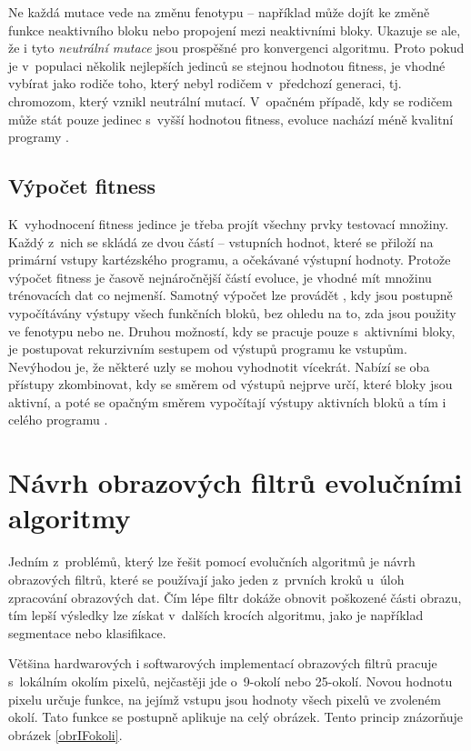 Ne každá mutace vede na změnu fenotypu -- například může dojít ke změně funkce neaktivního bloku nebo propojení mezi neaktivními bloky. Ukazuje se ale, že i tyto \emph{neutrální mutace} jsou prospěšné pro konvergenci algoritmu. Proto pokud je v~populaci několik nejlepších jedinců se stejnou hodnotou fitness, je vhodné vybírat jako rodiče toho, který nebyl rodičem v~předchozí generaci, tj. chromozom, který vznikl neutrální mutací. V~opačném případě, kdy se rodičem může stát pouze jedinec s~vyšší hodnotou fitness, evoluce nachází méně kvalitní programy \cite{ZelenaCGP, Modra}.

\subsection{Výpočet fitness}

K~vyhodnocení fitness jedince je třeba projít všechny prvky testovací množiny. Každý z~nich se skládá ze dvou částí -- vstupních hodnot, které se přiloží na primární vstupy kartézského programu, a očekávané výstupní hodnoty. Protože výpočet fitness je časově nejnáročnější částí evoluce, je vhodné mít množinu trénovacích dat co nejmenší. Samotný výpočet lze provádět , kdy jsou postupně vypočítávány výstupy všech funkčních bloků, bez ohledu na to, zda jsou použity ve fenotypu nebo ne. Druhou možností, kdy se pracuje pouze s~aktivními bloky, je postupovat rekurzivním sestupem od výstupů programu ke vstupům. Nevýhodou je, že některé uzly se mohou vyhodnotit vícekrát. Nabízí se oba přístupy zkombinovat, kdy se směrem od výstupů nejprve určí, které bloky jsou aktivní, a poté se opačným směrem vypočítají výstupy aktivních bloků a tím i celého programu \cite{Modra}.

\section{Návrh obrazových filtrů evolučními algoritmy}
\label{secIF}

Jedním z~problémů, který lze řešit pomocí evolučních algoritmů je návrh obrazových filtrů, které se používají jako jeden z~prvních kroků u~úloh zpracování obrazových dat. Čím lépe filtr dokáže obnovit poškozené části obrazu, tím lepší výsledky lze získat v~dalších krocích algoritmu, jako je například segmentace nebo klasifikace.

Většina hardwarových i softwarových implementací obrazových filtrů pracuje s~lokálním okolím pixelů, nejčastěji jde o~9-okolí nebo 25-okolí. Novou hodnotu pixelu určuje funkce, na jejímž vstupu jsou hodnoty všech pixelů ve zvoleném okolí. Tato funkce se postupně aplikuje na celý obrázek. Tento princip znázorňuje obrázek \ref{obrIFokoli}.

